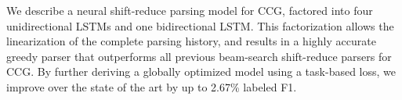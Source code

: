 We describe a neural shift-reduce parsing model for CCG, factored into four unidirectional LSTMs and one bidirectional LSTM. This factorization allows the linearization of the complete parsing history, and results in a highly accurate greedy parser that outperforms all previous beam-search shift-reduce parsers for CCG. By further deriving a globally optimized model using a task-based loss, we improve over the state of the art by up to 2.67\% labeled F1.
